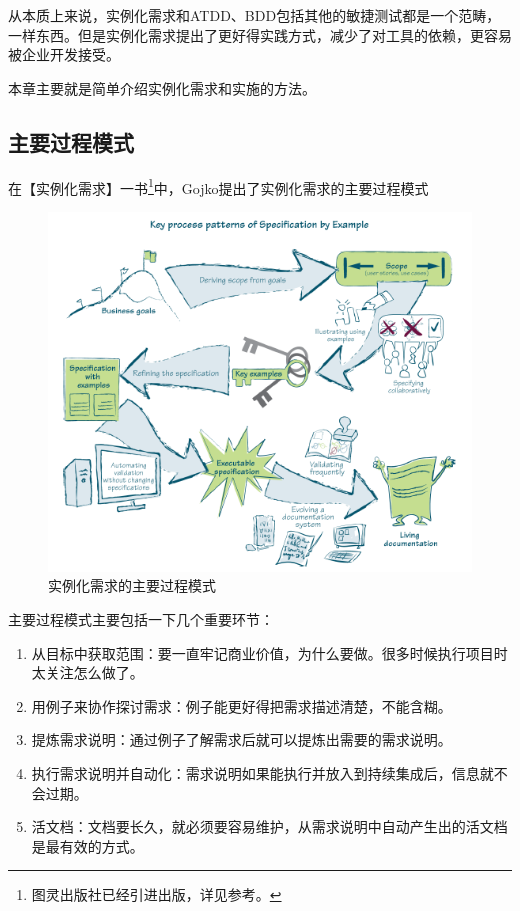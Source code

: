 从本质上来说，实例化需求和ATDD、BDD包括其他的敏捷测试都是一个范畴，一样东西。但是实例化需求提出了更好得实践方式，减少了对工具的依赖，更容易被企业开发接受。

本章主要就是简单介绍实例化需求和实施的方法。

\subsection{主要过程模式}
\label{主要过程模式}

在【实例化需求】一书\footnote{图灵出版社已经引进出版，详见参考。}中，Gojko提出了实例化需求的主要过程模式

\begin{figure}[htbp]
\centering
\includegraphics[keepaspectratio,width=\textwidth,height=0.75\textheight]{img/18333fig0502-tn.png}
\caption{实例化需求的主要过程模式}
\end{figure}

主要过程模式主要包括一下几个重要环节：

\begin{enumerate}
\item 从目标中获取范围：要一直牢记商业价值，为什么要做。很多时候执行项目时太关注怎么做了。

\item 用例子来协作探讨需求：例子能更好得把需求描述清楚，不能含糊。

\item 提炼需求说明：通过例子了解需求后就可以提炼出需要的需求说明。

\item 执行需求说明并自动化：需求说明如果能执行并放入到持续集成后，信息就不会过期。

\item 活文档：文档要长久，就必须要容易维护，从需求说明中自动产生出的活文档是最有效的方式。

\end{enumerate}

